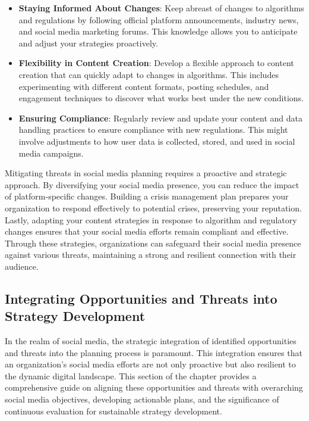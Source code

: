 \documentclass[
]{book}
\providecommand{\tightlist}{%
  \setlength{\itemsep}{0pt}\setlength{\parskip}{0pt}}
\begin{document}
\begin{itemize}
\tightlist
\item
  \textbf{Staying Informed About Changes}: Keep abreast of changes to algorithms and regulations by following official platform announcements, industry news, and social media marketing forums. This knowledge allows you to anticipate and adjust your strategies proactively.
\item
  \textbf{Flexibility in Content Creation}: Develop a flexible approach to content creation that can quickly adapt to changes in algorithms. This includes experimenting with different content formats, posting schedules, and engagement techniques to discover what works best under the new conditions.
\item
  \textbf{Ensuring Compliance}: Regularly review and update your content and data handling practices to ensure compliance with new regulations. This might involve adjustments to how user data is collected, stored, and used in social media campaigns.
\end{itemize}

Mitigating threats in social media planning requires a proactive and strategic approach. By diversifying your social media presence, you can reduce the impact of platform-specific changes. Building a crisis management plan prepares your organization to respond effectively to potential crises, preserving your reputation. Lastly, adapting your content strategies in response to algorithm and regulatory changes ensures that your social media efforts remain compliant and effective. Through these strategies, organizations can safeguard their social media presence against various threats, maintaining a strong and resilient connection with their audience.

\hypertarget{integrating-opportunities-and-threats-into-strategy-development}{%
\subsection*{Integrating Opportunities and Threats into Strategy Development}\label{integrating-opportunities-and-threats-into-strategy-development}}

In the realm of social media, the strategic integration of identified opportunities and threats into the planning process is paramount. This integration ensures that an organization's social media efforts are not only proactive but also resilient to the dynamic digital landscape. This section of the chapter provides a comprehensive guide on aligning these opportunities and threats with overarching social media objectives, developing actionable plans, and the significance of continuous evaluation for sustainable strategy development.
\end{document}
